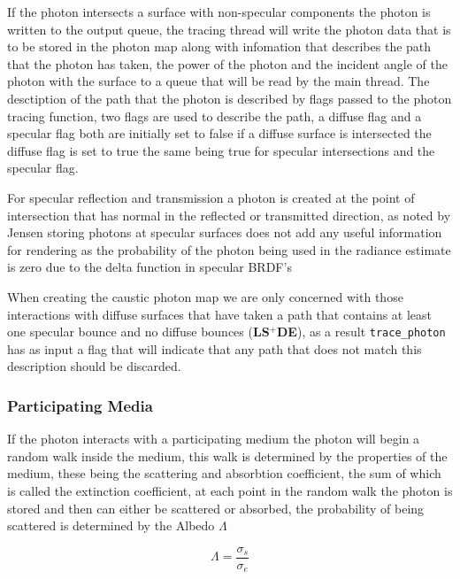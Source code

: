 If the photon intersects a surface with non-specular components the photon is written to the output queue, 
the tracing thread will write the photon data that is to be stored in
the photon map along with infomation that describes the path that the photon has taken, the power of the photon and the
incident angle of the photon with the surface to a queue that will be read by the main thread.
The desctiption of the path that the photon is described by flags passed to the photon tracing function,
two flags are used to describe the path, a diffuse flag and a specular flag both are initially set to false if a diffuse
surface is intersected the diffuse flag is set to true the same being true for specular intersections and the specular flag.

For specular reflection and transmission a photon is created at the point of intersection that has normal in the reflected
or transmitted direction, as noted by Jensen \cite{JensenBook} storing photons at specular surfaces does not add any useful
information for rendering as the probability of the photon being used in the radiance estimate is zero due to the
delta function in specular BRDF's

When creating the caustic photon map we are only concerned with those interactions with diffuse surfaces that have
taken a path that contains at least one specular bounce and no diffuse bounces (\textbf{LS$^+$DE}), as a result \texttt{trace\_photon}
has as input a flag that will indicate that any path that does not match this description should be discarded.

\subsubsection{Participating Media}
If the photon interacts with a participating medium the photon will begin a random walk inside the medium, this walk
is determined by the properties of the medium, these being the scattering and absorbtion coefficient, the sum of which
is called the extinction coefficient, at each point in the random walk the photon is stored and then can either be
scattered or absorbed, the probability of being scattered is determined by the Albedo $\Lambda$


\begin{equation}
\Lambda = \frac{\sigma_s}{\sigma_e}
\end{equation}

